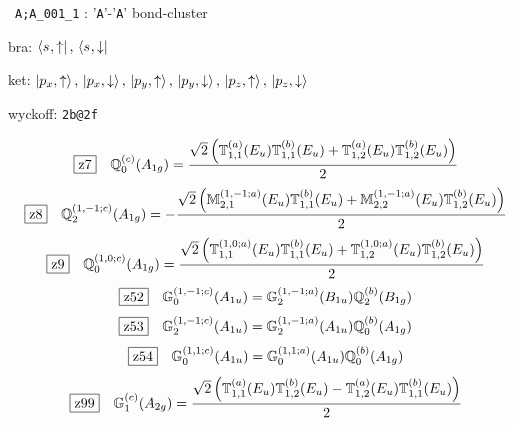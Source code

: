 \documentclass[fleqn,10pt,landscape]{jsarticle}
\begin{document}
\noindent\textbullet\, \texttt{A;A_001_1} : '\texttt{A}'-'\texttt{A}' bond-cluster

\noindent\quad * bra: $\bra{s_{},\uparrow},\, \bra{s_{},\downarrow}$

\noindent\quad * ket: $\ket{p_{x},\uparrow},\, \ket{p_{x},\downarrow},\, \ket{p_{y},\uparrow},\, \ket{p_{y},\downarrow},\, \ket{p_{z},\uparrow},\, \ket{p_{z},\downarrow}$

\noindent\quad * wyckoff: \texttt{2b@2f}

\begin{dmath*}
\hspace*{3mm}\fbox{z7}\quad \mathbb{Q}_{0}^{(c)}(A_{1g})=\frac{\sqrt{2} \left(\mathbb{T}_{1,1}^{(a)}(E_{u}) \mathbb{T}_{1,1}^{(b)}(E_{u}) + \mathbb{T}_{1,2}^{(a)}(E_{u}) \mathbb{T}_{1,2}^{(b)}(E_{u})\right)}{2}
\end{dmath*}
\begin{dmath*}
\hspace*{3mm}\fbox{z8}\quad \mathbb{Q}_{2}^{(1,-1;c)}(A_{1g})=- \frac{\sqrt{2} \left(\mathbb{M}_{2,1}^{(1,-1;a)}(E_{u}) \mathbb{T}_{1,1}^{(b)}(E_{u}) + \mathbb{M}_{2,2}^{(1,-1;a)}(E_{u}) \mathbb{T}_{1,2}^{(b)}(E_{u})\right)}{2}
\end{dmath*}
\begin{dmath*}
\hspace*{3mm}\fbox{z9}\quad \mathbb{Q}_{0}^{(1,0;c)}(A_{1g})=\frac{\sqrt{2} \left(\mathbb{T}_{1,1}^{(1,0;a)}(E_{u}) \mathbb{T}_{1,1}^{(b)}(E_{u}) + \mathbb{T}_{1,2}^{(1,0;a)}(E_{u}) \mathbb{T}_{1,2}^{(b)}(E_{u})\right)}{2}
\end{dmath*}
\begin{dmath*}
\hspace*{3mm}\fbox{z52}\quad \mathbb{G}_{0}^{(1,-1;c)}(A_{1u})=\mathbb{G}_{2}^{(1,-1;a)}(B_{1u}) \mathbb{Q}_{2}^{(b)}(B_{1g})
\end{dmath*}
\begin{dmath*}
\hspace*{3mm}\fbox{z53}\quad \mathbb{G}_{2}^{(1,-1;c)}(A_{1u})=\mathbb{G}_{2}^{(1,-1;a)}(A_{1u}) \mathbb{Q}_{0}^{(b)}(A_{1g})
\end{dmath*}
\begin{dmath*}
\hspace*{3mm}\fbox{z54}\quad \mathbb{G}_{0}^{(1,1;c)}(A_{1u})=\mathbb{G}_{0}^{(1,1;a)}(A_{1u}) \mathbb{Q}_{0}^{(b)}(A_{1g})
\end{dmath*}
\begin{dmath*}
\hspace*{3mm}\fbox{z99}\quad \mathbb{G}_{1}^{(c)}(A_{2g})=\frac{\sqrt{2} \left(\mathbb{T}_{1,1}^{(a)}(E_{u}) \mathbb{T}_{1,2}^{(b)}(E_{u}) - \mathbb{T}_{1,2}^{(a)}(E_{u}) \mathbb{T}_{1,1}^{(b)}(E_{u})\right)}{2}
\end{dmath*}
\end{document}
